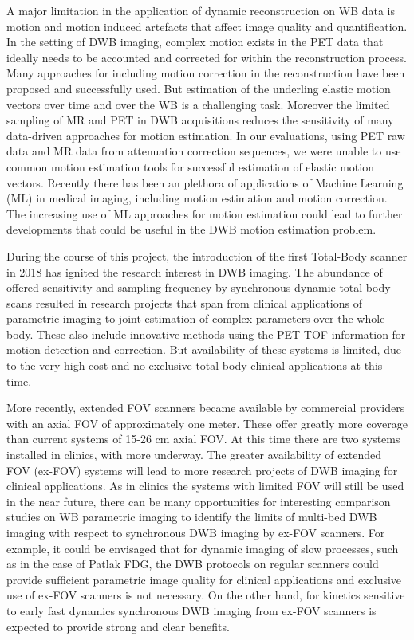 A major limitation in the application of dynamic reconstruction on WB data is motion and motion induced artefacts that affect image quality and quantification. 
In the setting of DWB imaging, complex motion exists in the PET data that ideally needs to be accounted and corrected for within the reconstruction process. 
Many approaches for including motion correction in the reconstruction have been proposed and successfully used. But estimation of the underling elastic motion vectors over time and over the WB is a challenging task. Moreover the limited sampling of MR and PET in DWB acquisitions reduces the sensitivity of many data-driven approaches for motion estimation. In our evaluations, using PET raw data and MR data from attenuation correction sequences, we were unable to use common motion estimation tools for successful estimation of elastic motion vectors.
Recently there has been an plethora of applications of Machine Learning (ML) in medical imaging, including motion estimation and motion correction.
The increasing use of ML approaches for motion estimation could lead to further developments that could be useful in the DWB motion estimation problem.

During the course of this project, the introduction of the first Total-Body scanner in 2018 has ignited the research interest in DWB imaging. The abundance of offered sensitivity and sampling frequency by synchronous dynamic total-body scans resulted in research projects that span from clinical applications of parametric imaging to joint estimation of complex parameters over the whole-body. These also include innovative methods using the PET TOF information for motion detection and correction.
But availability of these systems is limited, due to the very high cost and no exclusive total-body clinical applications at this time.

More recently, extended FOV scanners became available by commercial providers with an axial FOV of approximately one meter. These offer greatly more coverage than current systems of 15-26 cm axial FOV. At this time there are two systems installed in clinics, with more underway. The greater availability of extended FOV (ex-FOV) systems will lead to more research projects of DWB imaging for clinical applications. As in clinics the systems with limited FOV will still be used in the near future, there can be many opportunities for interesting comparison studies on WB parametric imaging to identify the limits of multi-bed DWB imaging with respect to synchronous DWB imaging by ex-FOV scanners.
For example, it could be envisaged that for dynamic imaging of slow processes, such as in the case of Patlak FDG, the DWB protocols on regular scanners could provide sufficient parametric image quality for clinical applications and exclusive use of ex-FOV scanners is not necessary. On the other hand, for kinetics sensitive to early fast dynamics synchronous DWB imaging from ex-FOV scanners is expected to provide strong and clear benefits.


